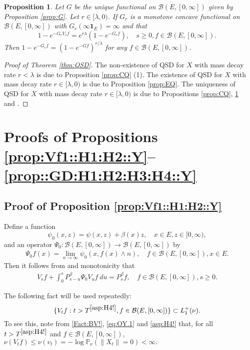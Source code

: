 \documentclass[12pt,a4paper]{amsart}
\numberwithin{equation}{section}
\theoremstyle{plain}
\newtheorem{prop}[thm]{Proposition}
\theoremstyle{definition}
\theoremstyle{remark}
\begin{document}
\begin{prop} \label{prop:UC}
	Let $G$ be the unique functional on $\mathcal B(E,[0,\infty])$ given by Proposition \ref{prop:G}.
	Let $r \in [\lambda, 0)$.
	If $G_r$ is a monotone concave functional on $\mathcal B(E,[0,\infty])$ with $G_r(\infty \mathbf 1_E) = \infty$ and that 
\[
	1 - e^{-G_r V_s f} = e^{r\lambda }(1- e^{- G_r f}), \quad s\geq 0, f\in \mathcal B(E,[0,\infty]). 
\]
	Then $1 - e^{-G_rf} = (1 - e^{- G f})^{r/\lambda}$ for any $f\in \mathcal B(E,[0,\infty])$. 
\end{prop}

\begin{proof}[Proof of Theorem \ref{thm:QSD}]
	The non-existence of QSD for $X$ with mass decay rate $r < \lambda$ is due to Proposition \ref{prop:CQ} (1).
	The existence of QSD for $X$ with mass decay rate $r \in [\lambda,0)$ is due to Proposition \ref{prop:EQ}.
	The uniqueness of QSD for $X$ with mass decay rate $r\in [\lambda , 0)$ is due to Propositions \ref{prop:CQ}, \ref{prop:UC} and \cite[Theorem 1.17]{Li2011MeasureValued}.
\end{proof}

\section{Proofs of Propositions \ref{prop:Vf1::H1:H2::Y}--\ref{prop::GD:H1:H2:H3:H4::Y}}
\subsection{Proof of Proposition \ref{prop:Vf1::H1:H2::Y}} \label{sec:Vf1}
	Define a function
\[
	\psi_0(x,z) = \psi(x,z)+ \beta(x) z, \quad x\in E, z\in [0,\infty),
\]	
	and an operator $\Psi_0: \mathcal B(E, [0,\infty]) \to \mathcal B(E,[0,\infty])$ by
\begin{align}
	\Psi_0 f(x)
	= \lim_{n\to \infty} \psi_0(x,f(x) \wedge n),
	\quad f\in \mathcal B(E,[0,\infty]), x\in E.
\end{align}
	Then it follows from \cite[Theorem 2.23]{Li2011MeasureValued} and monotonicity that
\begin{align}\label{eq:Vf1.1}
	V_s f + \int_0^s P_{s-u}^\beta \Psi_0 V_{u} f ~du
	= P_s^\beta f,
	\quad f\in \mathcal B(E,[0,\infty]), s\geq 0.
\end{align}

	The following fact will be used repeatedly:
\begin{equation} \label{lem:nV::H2::Vf1}
	\{V_tf:t> T^{\eqref{asp:H4!}}, f\in \mathcal B(E, [0,\infty])\}\subset L_1^+(\nu).
\end{equation}
	To see this, note from \eqref{Fact:BV!}, \eqref{eq:OY.1} and \eqref{asp:H4!} that, for  all $t> T^{\eqref{asp:H4!}}$ and $f\in \mathcal B(E,[0,\infty])$, $\nu(V_t f) \leq \nu(v_t)   = - \log \mathbb P_\nu (\|X_t\| = 0)  < \infty. $
\end{document}

